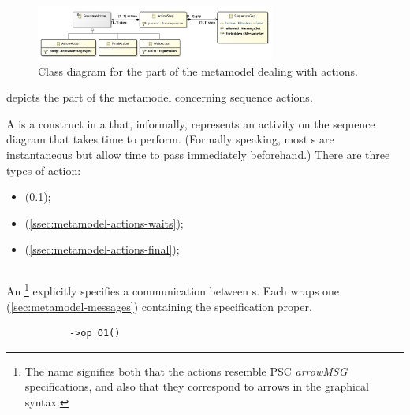 \begin{figure}
	\centering
	\includegraphics[width=0.7\textwidth]{diagrams/Actions}
	\caption{Class diagram for the part of the \langname{} metamodel dealing with actions.}
	\label{fig:metamodel-actions}
\end{figure}

 depicts the part of the metamodel concerning
sequence actions.

A \msequenceaction{} is a construct in a \msubsequence{} that, informally,
represents an activity on the sequence diagram that takes time to perform.
(Formally speaking, most \msequenceaction s are instantaneous but
allow time to pass immediately beforehand.)
There are three types of action:
\begin{itemize}
\item \marrowaction{} (\cref{ssec:metamodel-actions-arrows});
\item \mwaitaction{} (\cref{ssec:metamodel-actions-waits});
\item \mfinalaction{} (\cref{ssec:metamodel-actions-final});
\end{itemize}

\subsection{\marrowaction}\label{ssec:metamodel-actions-arrows}

An \marrowaction\footnote{The name signifies both that the actions resemble
PSC \emph{arrowMSG} specifications, and also that they correspond to arrows in
the graphical syntax.} explicitly specifies a communication between \mactor s.
Each \marrowaction{} wraps one
\marrowmessagespec{} (\cref{sec:metamodel-messages})
containing the specification proper.

\begin{figure}[H]
\begin{subfigure}[t]{\egtextwidth}
\begin{lstlisting}[style=Example]
->op O1()
\end{lstlisting}
\end{subfigure}
\hfill
\begin{subfigure}[t]{\eggraphicalwidth}
\gsecaption
\centering
{}
\end{subfigure}

\end{figure}

